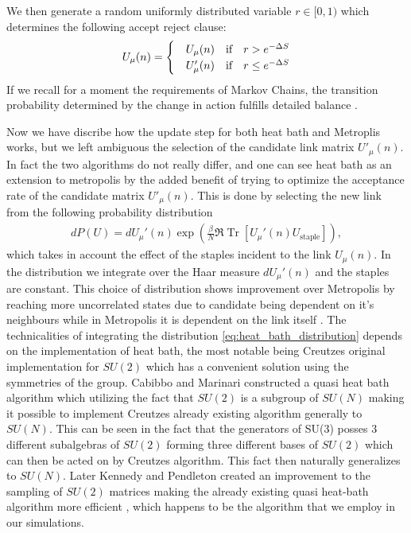 \documentclass[english,twoside,openright]{UH_TCM_MSc}
\DeclareMathOperator{\Tr}{Tr}
\begin{document}
We then generate a random uniformly distributed variable $ r \in [0,1)$ which determines the following accept reject clause:
\begin{align}
    U_\mu(n) = \begin{cases}
        & U_\mu(n) \hspace{10px}\text{if}\hspace{10px} r > e^{-\Delta S} \\
        & U'_\mu(n) \hspace{10px}\text{if}\hspace{10px} r \leq e^{-\Delta S}
    \end{cases}
\end{align}
If we recall for a moment the requirements of Markov Chains, the transition probability determined by the change in action fulfills detailed balance \cite{CREUTZ_PAPER}. 

Now we have discribe how the update step for both heat bath and Metroplis works, but we left ambiguous the selection of the candidate link matrix $U'_\mu(n)$. In fact the two algorithms do not really differ, and one can see heat bath as an extension to metropolis by the added benefit of trying to optimize the acceptance rate of the candidate matrix $U'_\mu(n)$. This is done by selecting the new link from the following probability distribution
\begin{align}
    dP(U) = dU_\mu'(n) \exp\left(\frac{\beta}{N}\Re \Tr[U_\mu'(n) U_{\text{staple}}]\right), \label{eq:heat_bath_distribution}
\end{align}
which takes in account the effect of the staples incident to the link $U_\mu(n)$. In the distribution we integrate over the Haar measure $dU_\mu'(n)$ and the staples are constant. This choice of distribution shows improvement over Metropolis by reaching more uncorrelated states due to candidate being dependent on it's neighbours while in Metropolis it is dependent on the link itself \cite[ch. 1]{KENNEDY1985393}. The technicalities of integrating the distribution \ref{eq:heat_bath_distribution} depends on the implementation of heat bath, the most notable being Creutzes original implementation for $SU(2)$ \cite{Creutz_SU2} which has a convenient solution using the symmetries of the group. Cabibbo and Marinari \cite{CABIBBO1982387} constructed a quasi heat bath algorithm which utilizing the fact that $SU(2)$ is a subgroup of $SU(N)$ making it possible to implement Creutzes already existing algorithm generally to $SU(N)$. This can be seen in the fact that the generators of SU(3) posses 3 different subalgebras of $SU(2)$ forming three different bases of $SU(2)$ \cite[ch. 4.2]{pfeifer2003lie} which can then be acted on by Creutzes algorithm. This fact then naturally generalizes to $SU(N)$. Later Kennedy and Pendleton created an improvement to the sampling of $SU(2)$ matrices making the already existing quasi heat-bath algorithm more efficient \cite{KENNEDY1985393}, which happens to be the algorithm that we employ in our simulations.
\end{document}
